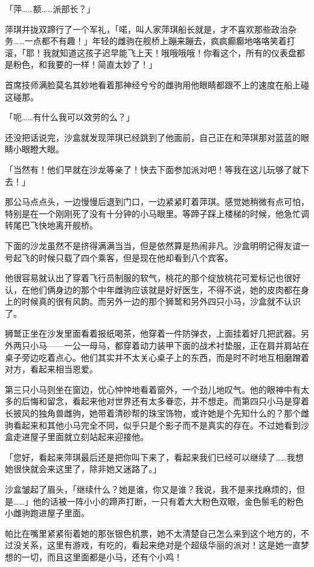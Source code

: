 「萍……额……派部长？」

萍琪并拢双蹄行了一个军礼，「喏，叫人家萍琪船长就是，才不喜欢那些政治杂务……一点都不有趣！」年轻的雌驹在舰桥上蹦来蹦去，疯疯癫癫地咯咯笑着打滚，「耶！我就知道这孩子迟早能飞上天！哦哦哦哦！你看这个，所有的仪表盘都是粉色，和我要的一样！简直太妙了！」

首席技师满脸莫名其妙地看着那神经兮兮的雌驹用他眼睛都跟不上的速度在船上碰这碰那。

「呃……有什么我可以效劳的么？」

还没把话说完，沙盒就发现萍琪已经跳到了他面前，自己正在和萍琪那对蓝蓝的眼睛小眼瞪大眼。

「当然有！他们早就在沙龙等亲了！快去下面参加派对吧！等我在这儿玩够了就下去！」

那公马点点头，一边慢慢后退到门口，一边紧紧盯着萍琪。感觉她稍微有点可怕，特别是在一个刚刚死了没有十分钟的小马眼里。等蹄子踩上楼梯的时候，他急忙调转尾巴飞快地离开舰桥。

下面的沙龙虽然不是挤得满满当当，但是依然算是热闹非凡。沙盒明明记得友谊一号起飞的时候只载了四个乘客，但是现在他却看到八个宾客。

他很容易就认出了穿着飞行员制服的软气，桃花的那个绽放桃花可爱标记也很好认，在他们俩身边的那个中年雌驹应该就是好好医生，不得不说，她的皮肉都在身上的时候真的很有风韵。而另外一边的那个狮鹫和另外四只小马，沙盒就不认识了。

狮鹫正坐在沙发里面看着报纸喝茶，他穿着一件防弹衣，上面挂着好几把武器。另外两只小马——一公一母马，都穿着动力装甲下面的战术衬垫服，正在肩并肩站在桌子旁边吃着点心。他们其实并不太关心桌子上的东西，而是时不时地互相磨蹭着对方，看起来相当恩爱。

第三只小马则坐在窗边，忧心忡忡地看着窗外，一个劲儿地叹气。他的眼神中有太多的后悔和留念，看起来他对世界还有太多眷恋，并不想走。而第四只小马是穿着长披风的独角兽雌驹，她带着清砂帮的珠宝饰物，或许她是个先知什么的？那个雌驹看起来和其他小马完全不同，似乎只是个影子而不是真实的存在。不过她看到沙盒走进屋子里面就立刻站起来迎接他。

「您好，看起来萍琪最后还是把你叫下来了，看起来我们已经可以继续了……我想她很快就会来这里了，除非她又迷路了。」

沙盒皱起了眉头，「继续什么？她是谁，你又是谁？我说，我不是来找麻烦的，但是……」他的话被一阵小小的蹄声打断，一只有着大大粉色双眼，金色鬃毛的粉色小雌驹跑进屋子里面。

帕比在嘴里紧紧衔着她的那张银色机票，她不太清楚自己怎么来到这个地方的，不过没关系，这里有游戏，有吃的，看起来绝对是个超级华丽的派对！这是她一直梦想的一切，而且这里面都是小马，还有个小鸡！


